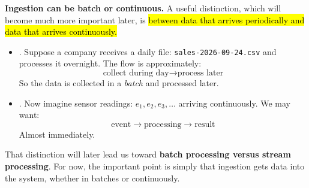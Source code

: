 \highspace
\textcolor{Green3}{ \textbf{Ingestion can be batch or continuous.}} A useful distinction, which will become much more important later, is \hl{between data that arrives periodically and data that arrives continuously.}
\begin{itemize}
    \item {}. Suppose a company receives a daily file: \texttt{sales-2026-09-24.csv} and processes it overnight. The flow is approximately:
        \begin{equation*}
            \text{collect during day}
            \rightarrow
            \text{process later}
        \end{equation*}
        So the data is collected in a \emph{batch} and processed later.

    \item {}. Now imagine sensor readings: $e_1,e_2,e_3,\ldots$ arriving continuously. We may want:
        \begin{equation*}
            \text{event}
            \rightarrow
            \text{processing}
            \rightarrow
            \text{result}
        \end{equation*}
        Almost immediately.
\end{itemize}
That distinction will later lead us toward \textbf{batch processing versus stream processing}. For now, the important point is simply that ingestion gets data into the system, whether in batches or continuously.

